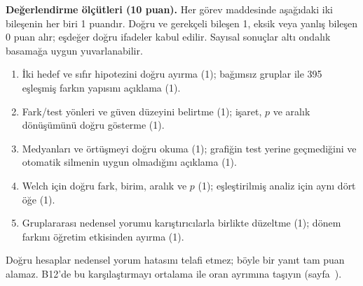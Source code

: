 \textbf{Değerlendirme ölçütleri (10 puan).} Her görev maddesinde
aşağıdaki iki bileşenin her biri 1 puandır. Doğru ve gerekçeli bileşen
1, eksik veya yanlış bileşen 0 puan alır; eşdeğer doğru ifadeler kabul
edilir. Sayısal sonuçlar altı ondalık basamağa uygun yuvarlanabilir.
\begin{enumerate}
  \item İki hedef ve sıfır hipotezini doğru ayırma (1);
  bağımsız gruplar ile 395 eşleşmiş farkın yapısını açıklama (1).
  \item Fark/test yönleri ve güven düzeyini belirtme (1);
  işaret, $p$ ve aralık dönüşümünü doğru gösterme (1).
  \item Medyanları ve örtüşmeyi doğru okuma (1);
  grafiğin test yerine geçmediğini ve otomatik silmenin uygun
  olmadığını açıklama (1).
  \item Welch için doğru fark, birim, aralık ve $p$ (1);
  eşleştirilmiş analiz için aynı dört öğe (1).
  \item Gruplararası nedensel yorumu karıştırıcılarla birlikte
  düzeltme (1); dönem farkını öğretim etkisinden ayırma (1).
\end{enumerate}
Doğru hesaplar nedensel yorum hatasını telafi etmez; böyle bir yanıt
tam puan alamaz. B12'de bu karşılaştırmayı ortalama ile oran ayrımına
taşıyın (sayfa~\pageref{sec:b12-karsilastirmali-gorev}).